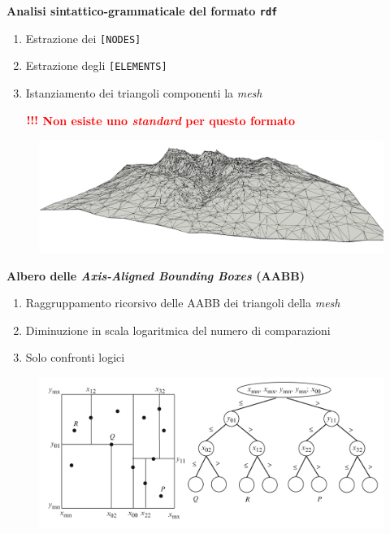 \documentclass[xcolor=dvipsnames]{beamer} %
\begin{document}
\begin{frame}[fragile]
	\Large{\textbf{Analisi sintattico-grammaticale del formato \texttt{rdf}}}
	\normalsize
	\begin{enumerate}
		\item Estrazione dei \texttt{[NODES]}
		\item Estrazione degli \texttt{[ELEMENTS]}
		\item Istanziamento dei triangoli componenti la \textit{mesh}
		\item[$\textcolor{red}{\textbf{!!!}}$] \textcolor{red}{\textbf{Non esiste uno \textit{standard} per questo formato}}
	\end{enumerate}
\begin{figure}
	\centering
	\includegraphics[width=0.7\linewidth]{../Figures/mesh}
\end{figure}
\end{frame}

\begin{frame}
	\Large{\textbf{Albero delle \textit{Axis-Aligned Bounding Boxes} (AABB)}}
	\normalsize
	\begin{enumerate}
		\item Raggruppamento ricorsivo delle AABB dei triangoli della \textit{mesh}
		\item Diminuzione in scala logaritmica del numero di comparazioni
		\item Solo confronti logici
	\end{enumerate}
	\begin{figure}
		\centering
		\includegraphics[width=0.85\linewidth]{../Figures/AABB}
	\end{figure}
\end{frame}
\end{document}
